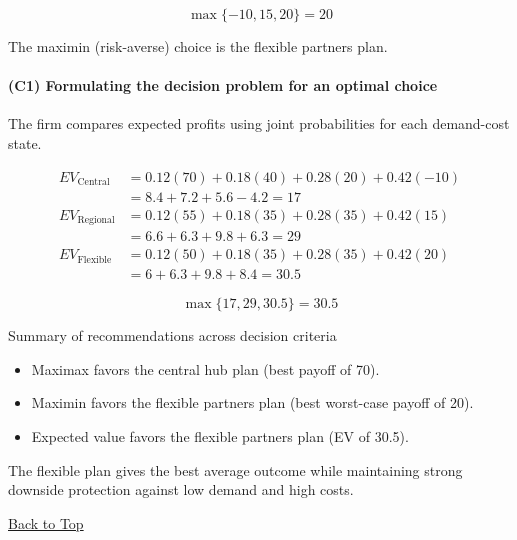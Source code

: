 \[
\max\{-10, 15, 20\} = 20
\]

The maximin (risk-averse) choice is the flexible partners plan.

\paragraph{(C1) Formulating the decision problem for an optimal choice}\label{subsubsec:practice-activity-2-solution-3-c1}

The firm compares expected profits using joint probabilities for each demand-cost state.

\[
\begin{aligned}
EV_{\text{Central}} &= 0.12(70) + 0.18(40) + 0.28(20) + 0.42(-10) \\
&= 8.4 + 7.2 + 5.6 - 4.2 = 17 \\
EV_{\text{Regional}} &= 0.12(55) + 0.18(35) + 0.28(35) + 0.42(15) \\
&= 6.6 + 6.3 + 9.8 + 6.3 = 29 \\
EV_{\text{Flexible}} &= 0.12(50) + 0.18(35) + 0.28(35) + 0.42(20) \\
&= 6 + 6.3 + 9.8 + 8.4 = 30.5
\end{aligned}
\]

\[
\max\{17, 29, 30.5\} = 30.5
\]

Summary of recommendations across decision criteria

\begin{itemize}
	\item Maximax favors the central hub plan (best payoff of 70).
	\item Maximin favors the flexible partners plan (best worst-case payoff of 20).
	\item Expected value favors the flexible partners plan (EV of 30.5).
\end{itemize}

The flexible plan gives the best average outcome while maintaining strong downside protection against low demand and high costs.

\vspace{6pt}
\noindent\hyperref[table-of-contents]{Back to Top}
